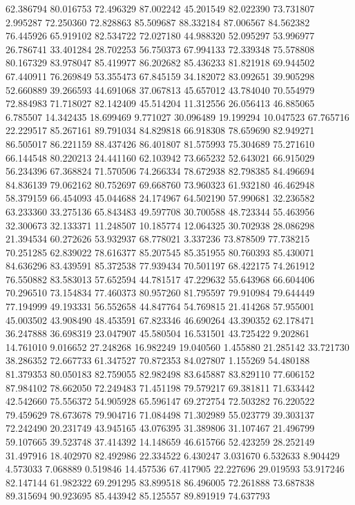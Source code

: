 62.386794
80.016753
72.496329
87.002242
45.201549
82.022390
73.731807
2.995287
72.250360
72.828863
85.509687
88.332184
87.006567
84.562382
76.445926
65.919102
82.534722
72.027180
44.988320
52.095297
53.996977
26.786741
33.401284
28.702253
56.750373
67.994133
72.339348
75.578808
80.167329
83.978047
85.419977
86.202682
85.436233
81.821918
69.944502
67.440911
76.269849
53.355473
67.845159
34.182072
83.092651
39.905298
52.660889
39.266593
44.691068
37.067813
45.657012
43.784040
70.554979
72.884983
71.718027
82.142409
45.514204
11.312556
26.056413
46.885065
6.785507
14.342435
18.699469
9.771027
30.096489
19.199294
10.047523
67.765716
22.229517
85.267161
89.791034
84.829818
66.918308
78.659690
82.949271
86.505017
86.221159
88.437426
86.401807
81.575993
75.304689
75.271610
66.144548
80.220213
24.441160
62.103942
73.665232
52.643021
66.915029
56.234396
67.368824
71.570506
74.266334
78.672938
82.798385
84.496694
84.836139
79.062162
80.752697
69.668760
73.960323
61.932180
46.462948
58.379159
66.454093
45.044688
24.174967
64.502190
57.990681
32.236582
63.233360
33.275136
65.843483
49.597708
30.700588
48.723344
55.463956
32.300673
32.133371
11.248507
10.185774
12.064325
30.702938
28.086298
21.394534
60.272626
53.932937
68.778021
3.337236
73.878509
77.738215
70.251285
62.839022
78.616377
85.207545
85.351955
80.760393
85.430071
84.636296
83.439591
85.372538
77.939434
70.501197
68.422175
74.261912
76.550882
83.583013
57.652594
44.781517
47.229632
55.643968
66.604406
70.296510
73.154834
77.460373
80.957260
81.795597
79.910984
79.644449
77.194999
49.193331
56.552658
44.847764
54.769815
21.414268
57.955001
45.003502
43.908490
48.453591
67.823346
46.690264
43.390352
62.178471
36.247888
36.698319
23.047907
45.580504
16.531501
43.725422
9.202861
14.761010
9.016652
27.248268
16.982249
19.040560
1.455880
21.285142
33.721730
38.286352
72.667733
61.347527
70.872353
84.027807
1.155269
54.480188
81.379353
80.050183
82.759055
82.982498
83.645887
83.829110
77.606152
87.984102
78.662050
72.249483
71.451198
79.579217
69.381811
71.633442
42.542660
75.556372
54.905928
65.596147
69.272754
72.503282
76.220522
79.459629
78.673678
79.904716
71.084498
71.302989
55.023779
39.303137
72.242490
20.231749
43.945165
43.076395
31.389806
31.107467
21.496799
59.107665
39.523748
37.414392
14.148659
46.615766
52.423259
28.252149
31.497916
18.402970
82.492986
22.334522
6.430247
3.031670
6.532633
8.904429
4.573033
7.068889
0.519846
14.457536
67.417905
22.227696
29.019593
53.917246
82.147144
61.982322
69.291295
83.899518
86.496005
72.261888
73.687838
89.315694
90.923695
85.443942
85.125557
89.891919
74.637793
